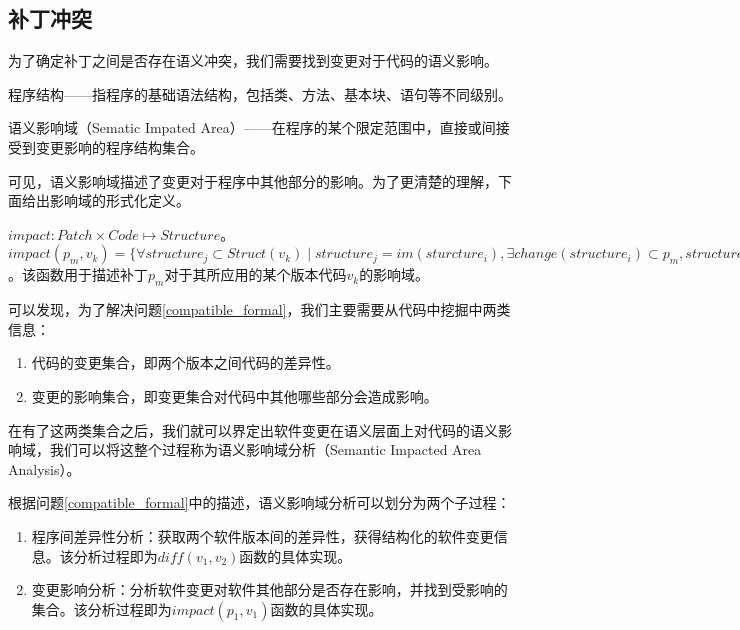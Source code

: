 \subsection{补丁冲突}

为了确定补丁之间是否存在语义冲突，我们需要找到变更对于代码的语义影响。

\begin{definition}
	程序结构——指程序的基础语法结构，包括类、方法、基本块、语句等不同级别。
\end{definition}

\begin{definition}
	语义影响域（Sematic Impated Area）——在程序的某个限定范围中，直接或间接受到变更影响的程序结构集合。
\end{definition}

可见，语义影响域描述了变更对于程序中其他部分的影响。为了更清楚的理解，下面给出影响域的形式化定义。

\begin{definition}
	$impact: Patch \times Code \mapsto {Structure}$。$impact(p_m, v_k) = \{ \forall structure_j \subset Struct(v_k) \mid structure_j = im(sturcture_i), \exists change(structure_i) \subset p_m,structure_i,\subset Struct(v_k),v_k \subset Code,p_m \subset Pat(v_k), i,j,k,m \subset \mathbb{N} \}$。该函数用于描述补丁$p_m$对于其所应用的某个版本代码$v_k$的影响域。
\end{definition}

可以发现，为了解决问题\ref {compatible_formal}，我们主要需要从代码中挖掘中两类信息：
\begin{enumerate}
	\item 代码的变更集合，即两个版本之间代码的差异性。
	\item 变更的影响集合，即变更集合对代码中其他哪些部分会造成影响。
\end{enumerate}

在有了这两类集合之后，我们就可以界定出软件变更在语义层面上对代码的语义影响域，我们可以将这整个过程称为语义影响域分析（Semantic Impacted Area Analysis）。

根据问题\ref {compatible_formal}中的描述，语义影响域分析可以划分为两个子过程：
\begin{enumerate}
	\item 程序间差异性分析：获取两个软件版本间的差异性，获得结构化的软件变更信息。该分析过程即为$diff(v_1,v_2)$函数的具体实现。
	\item 变更影响分析：分析软件变更对软件其他部分是否存在影响，并找到受影响的集合。该分析过程即为$impact(p_1,v_1)$函数的具体实现。
\end{enumerate}

